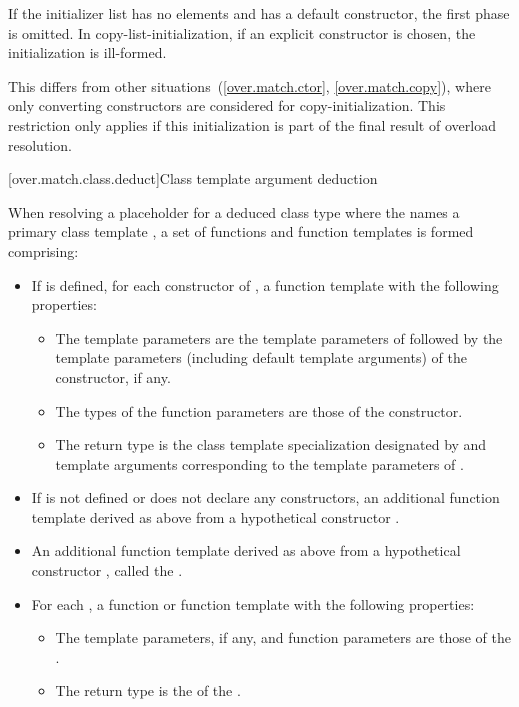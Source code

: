 If the initializer list has no elements and  has a default constructor,
the first phase is omitted.
In copy-list-initialization, if an explicit constructor is
chosen, the initialization is ill-formed. \begin{note}
This differs from other situations~(\ref{over.match.ctor}, \ref{over.match.copy}),
where only converting constructors are considered for copy-initialization.
This restriction only
applies if this initialization is part of the final result of overload
resolution. \end{note}

[over.match.class.deduct]{Class template argument deduction}%
%

\pnum
When resolving a placeholder for a deduced class type
where the  names a primary class template ,
a set of functions and function templates is formed comprising:
\begin{itemize}
\item
If  is defined,
for each constructor of ,
a function template with the following properties:
\begin{itemize}
\item
The template parameters are the template parameters of 
followed
by the template parameters (including default template arguments) of the constructor,
if any.
\item
The types of the function parameters are those of the constructor.
\item
The return type is the class template specialization
designated by 
and template arguments
corresponding to the template parameters of .
\end{itemize}

\item
If 
is not defined or does not declare any constructors,
an additional function template derived as above
from a hypothetical constructor .

\item
An additional function template derived as above
from a hypothetical constructor ,
called the .

\item
For each ,
a function or function template
with the following properties:

\begin{itemize}
\item
The template parameters, if any,
and function parameters
are those of the .
\item
The return type
is the 
of the .
\end{itemize}
\end{itemize}

